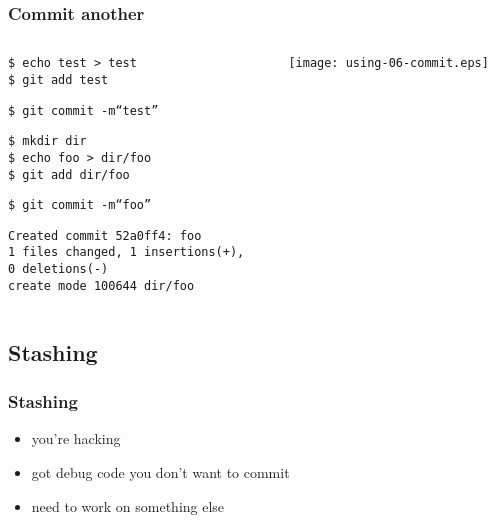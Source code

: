 \documentclass[english]{beamer}
\newcommand{\mysubsection}[2]{%
  \hypertarget{#2}{}%
  \subsection{#1}%
  \label{#2}%
}
\newcommand{\CMD}[1]{%
\texttt{\textcolor{code-green}{#1}}%
}
\newcommand{\cmd}[1]{%
\texttt{\textcolor{code-orange}{#1}}%
}
\newcommand{\fnt}[1]{%
\texttt{\textcolor{code-gray}{#1}}%
}
\begin{document}
\begin{frame}
\frametitle{Commit another}
\begin{columns}[t]
        \begin{column}[T]{.5\textwidth}
                \cmd{\$ echo test > test} \\
                \CMD{\$ git add test}

                \vspace{.1\textheight}

                \CMD{\$ git commit -m``test''} \\

                \vspace{.1\textheight}

                \cmd{\$ mkdir dir} \\
                \cmd{\$ echo foo > dir/foo} \\
                \CMD{\$ git add dir/foo}

                \vspace{.1\textheight}

                \CMD{\$ git commit -m``foo''} \\
                {\tiny
                \fnt{Created commit 52a0ff4: foo \\
                       1 files changed, 1 insertions(+), \\ 0 deletions(-) \\
                       create mode 100644 dir/foo}
                }
        \end{column}
        \begin{column}[T]{.5\textwidth}

                \texttt{[image: using-06-commit.eps]}

        \end{column}
\end{columns}
\end{frame}

\mysubsection{Stashing}{using:stashing}
\begin{frame}
\frametitle{Stashing}
\begin{itemize}
        \item you're hacking
                \pause{}
                \vspace{\baselineskip}
        \item got debug code you don't want to commit
                \pause{}
                \vspace{\baselineskip}
        \item need to work on something else
\end{itemize}
\end{frame}
\end{document}
